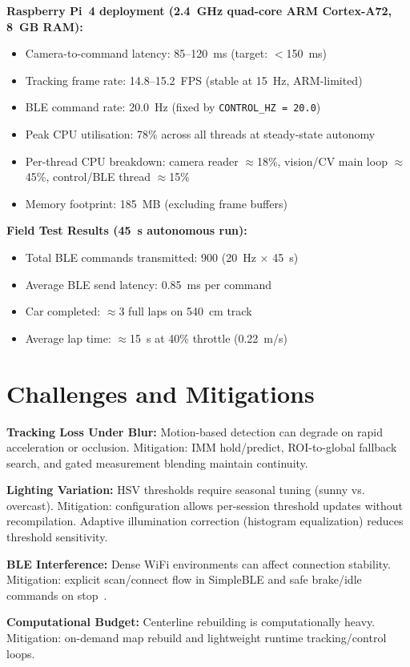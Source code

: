 \documentclass[twocolumn]{article}
\begin{document}
\textbf{Raspberry Pi~4 deployment (2.4~GHz quad-core ARM Cortex-A72, 8~GB RAM):}
\begin{itemize}
  \item Camera-to-command latency: 85--120~ms (target: $<$150~ms)
  \item Tracking frame rate: 14.8--15.2~FPS (stable at 15~Hz, ARM-limited)
  \item BLE command rate: 20.0~Hz (fixed by \texttt{CONTROL\_HZ~=~20.0})
  \item Peak CPU utilisation: 78\% across all threads at steady-state autonomy
  \item Per-thread CPU breakdown: camera reader $\approx$18\%, vision/CV main loop $\approx$45\%, control/BLE thread $\approx$15\%
  \item Memory footprint: 185~MB (excluding frame buffers)
\end{itemize}

\textbf{Field Test Results (45~s autonomous run):}
\begin{itemize}
  \item Total BLE commands transmitted: 900 (20~Hz $\times$ 45~s)
  \item Average BLE send latency: 0.85~ms per command
  \item Car completed: $\approx$3 full laps on 540~cm track
  \item Average lap time: $\approx$15~s at 40\% throttle (0.22~m/s)
\end{itemize}
\section{Challenges and Mitigations}

\textbf{Tracking Loss Under Blur:} Motion-based detection can degrade on rapid acceleration or occlusion. Mitigation: IMM hold/predict, ROI-to-global fallback search, and gated measurement blending maintain continuity.

\textbf{Lighting Variation:} HSV thresholds require seasonal tuning (sunny vs. overcast). Mitigation: configuration allows per-session threshold updates without recompilation. Adaptive illumination correction (histogram equalization) reduces threshold sensitivity.

\textbf{BLE Interference:} Dense WiFi environments can affect connection stability. Mitigation: explicit scan/connect flow in SimpleBLE and safe brake/idle commands on stop~\cite{rtthread2022}.

\textbf{Computational Budget:} Centerline rebuilding is computationally heavy. Mitigation: on-demand map rebuild and lightweight runtime tracking/control loops.
\end{document}
